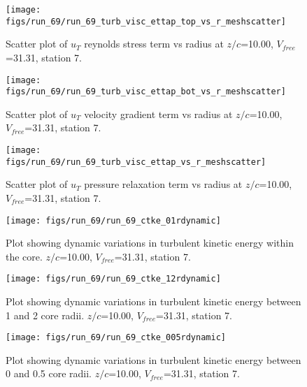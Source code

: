 \begin{figure}[H]
\centering
\texttt{[image: figs/run\_69/run\_69\_turb\_visc\_ettap\_top\_vs\_r\_meshscatter]}
\caption{Scatter plot of $
u_T$ reynolds stress term vs radius at $z/c$=10.00, $V_{free}$=31.31, station 7.}
\label{fig:run_69_turb_visc_ettap_top_vs_r_meshscatter}
\end{figure}


\begin{figure}[H]
\centering
\texttt{[image: figs/run\_69/run\_69\_turb\_visc\_ettap\_bot\_vs\_r\_meshscatter]}
\caption{Scatter plot of $
u_T$ velocity gradient term vs radius at $z/c$=10.00, $V_{free}$=31.31, station 7.}
\label{fig:run_69_turb_visc_ettap_bot_vs_r_meshscatter}
\end{figure}


\begin{figure}[H]
\centering
\texttt{[image: figs/run\_69/run\_69\_turb\_visc\_ettap\_vs\_r\_meshscatter]}
\caption{Scatter plot of $
u_T$ pressure relaxation term vs radius at $z/c$=10.00, $V_{free}$=31.31, station 7.}
\label{fig:run_69_turb_visc_ettap_vs_r_meshscatter}
\end{figure}


\begin{figure}[H]
\centering
\texttt{[image: figs/run\_69/run\_69\_ctke\_01rdynamic]}
\caption{Plot showing dynamic variations in turbulent kinetic energy within the core. $z/c$=10.00, $V_{free}$=31.31, station 7.}
\label{fig:run_69_ctke_01rdynamic}
\end{figure}


\begin{figure}[H]
\centering
\texttt{[image: figs/run\_69/run\_69\_ctke\_12rdynamic]}
\caption{Plot showing dynamic variations in turbulent kinetic energy between 1 and 2 core radii. $z/c$=10.00, $V_{free}$=31.31, station 7.}
\label{fig:run_69_ctke_12rdynamic}
\end{figure}


\begin{figure}[H]
\centering
\texttt{[image: figs/run\_69/run\_69\_ctke\_005rdynamic]}
\caption{Plot showing dynamic variations in turbulent kinetic energy between 0 and 0.5 core radii. $z/c$=10.00, $V_{free}$=31.31, station 7.}
\label{fig:run_69_ctke_005rdynamic}
\end{figure}


